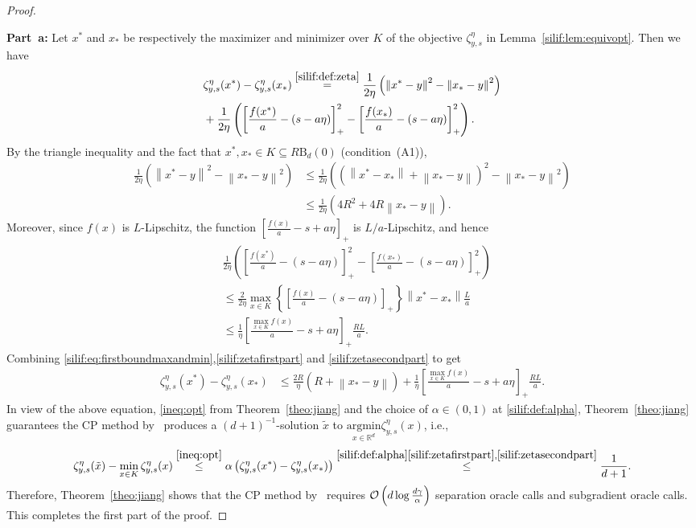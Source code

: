 \documentclass[11pt,letterpaper]{article}
\newcommand{\ball}{\mathrm{B}}
\newcommand{\R}{\mathbb{R}}
\newcommand{\norm}[1]{\left\lVert #1 \right\rVert}
\newcommand{\argmin}{\mathrm{argmin}  }
\newcommand{\nn}{\nonumber}
\newcommand{\brac}[1]{\left( #1\right)}
\begin{document}
\begin{proof} 
~\

\textbf{Part~a:}   Let $x^*$ and $x_*$ be respectively the maximizer and minimizer over $K$ of  the objective $\zeta^{\eta}_{y,s}$ in Lemma~\ref{silif:lem:equivopt}. Then we have  
    \begin{align}
    \label{silif:eq:firstboundmaxandmin}
        &\zeta^{\eta}_{y,s}(x^*)- \zeta^{\eta}_{y,s}(x_*) \stackrel{\eqref{silif:def:zeta}} = \frac{1}{2\eta}\brac{\norm{x^*-y}^2-\norm{x_*-y}^2 }\nn\\
        &+\frac{1}{2\eta}\brac{\left[ \frac{f(x^*)}{a} - (s - a\eta)\right]_{+}^2-\left[ \frac{f(x_*)}{a} - (s - a\eta)\right]_{+}^2}. 
    \end{align}
By the triangle inequality and the fact that $x^*,x_*\in K\subseteq R\ball_d(0)$ (condition~(A1)), 
\begin{align}
\label{silif:zetafirstpart}
   \frac{1}{2\eta}\brac{\norm{x^*-y}^2-\norm{x_*-y}^2 }&\leq \frac{1}{2\eta}\brac{\brac{\norm{x^*-x_*}+\norm{x_*-y}}^2-\norm{x_*-y}^2 }\nonumber\\
    &\leq \frac{1}{2\eta}\brac{4R^2+4R\norm{x_*-y} }. 
\end{align}
Moreover, since $f(x)$ is $L$-Lipschitz, the function $\left[\frac{f(x)}{a}-s+a\eta\right]_{+}$ is $L/a$-Lipschitz, and hence 
\begin{align}
\label{silif:zetasecondpart}
    &\frac{1}{2\eta}\brac{\left[ \frac{f(x^*)}{a} - (s - a\eta)\right]_{+}^2-\left[ \frac{f(x_*)}{a} - (s - a\eta)\right]_{+}^2}\nonumber\\
    &\leq \frac{2}{2\eta}\max_{x\in K} \left\{\left[ \frac{f(x)}{a} - (s - a\eta)\right]_{+}\right\}\norm{x^*-x_*}\frac{L}{a}\nonumber\\
    &\leq\frac{1}{\eta}  \left[\frac{\max_{x\in K}f(x)}{a}-s+a\eta\right]_{+}\frac{RL}{a}. 
\end{align}
Combining \eqref{silif:eq:firstboundmaxandmin},\eqref{silif:zetafirstpart} and \eqref{silif:zetasecondpart} to get
\begin{align*}
     \zeta^{\eta}_{y,s}(x^*)- \zeta^{\eta}_{y,s}(x_*)&\leq \frac{2R}{\eta}\brac{R+\norm{x_*-y} }+\frac{1}{\eta}  \left[\frac{\max_{x\in K}f(x)}{a}-s+a\eta\right]_{+}\frac{RL}{a}. 
\end{align*}
In view of the above equation, \eqref{ineq:opt} from Theorem~\ref{theo:jiang} and the choice of $\alpha\in (0,1)$ at \eqref{silif:def:alpha}, Theorem~\ref{theo:jiang} guarantees the CP method by~\cite{jiang2020cuttingplane} produces a $(d+1)^{-1}$-solution $\tilde{x}$  to  $\underset{x\in\R^d}{\argmin} \zeta^{\eta}_{y,s}(x)$, i.e.,
\[
\zeta^{\eta}_{y,s}(\tilde x)-\min_{x \in K} \zeta^{\eta}_{y,s}(x)\stackrel{\eqref{ineq:opt}}{\leq}    \alpha\brac{ \zeta^{\eta}_{y,s}(x^*)- \zeta^{\eta}_{y,s}(x_*)}\stackrel{\eqref{silif:def:alpha}\eqref{silif:zetafirstpart}, \eqref{silif:zetasecondpart}}{\leq} \frac{1}{d+1}. 
\]
Therefore, Theorem~\ref{theo:jiang} shows that the CP method by~\cite{jiang2020cuttingplane} requires  ${\cal O}\left(d \log \frac{d \gamma}{\alpha}\right)$ separation oracle calls and subgradient oracle calls. This completes the first part of the proof. 


\end{proof}
\end{document}

